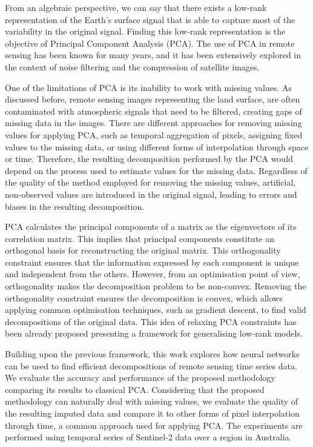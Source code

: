 \documentclass[essd, manuscript]{copernicus}
\begin{document}
From an algebraic perspective, we can say that there exists a low-rank representation of the Earth's surface signal that is able to capture most of the variability in the original signal. Finding this low-rank representation is the objective of Principal Component Analysis (PCA). The use of PCA in remote sensing has been known for many years, and it has been extensively explored in the context of noise filtering and the compression of satellite images.

One of the limitations of PCA is its inability to work with missing values. As discussed before, remote sensing images representing the land surface, are often contaminated with atmospheric signals that need to be filtered, creating gaps of missing data in the images. There are different approaches for removing missing values for applying PCA, such as temporal aggregation of pixels, assigning fixed values to the missing data, or using different forms of interpolation through space or time. Therefore, the resulting decomposition performed by the PCA would depend on the process used to estimate values for the missing data. Regardless of the quality of the method employed for removing the missing values, artificial, non-observed values are introduced in the original signal, leading to errors and biases in the resulting decomposition.

PCA calculates the principal components of a matrix as the eigenvectors of its correlation matrix. This implies that principal components constitute an orthogonal basis for reconstructing the original matrix. This orthogonality constraint ensures that the information expressed by each component is unique and independent from the others. However, from an optimisation point of view, orthogonality makes the decomposition problem to be non-convex. Removing the orthogonality constraint ensures the decomposition is convex, which allows applying common optimisation techniques, such as gradient descent, to find valid decompositions of the original data. This idea of relaxing PCA constraints has been already proposed \citep{udell2014generalized} presenting a framework for generalising low-rank models.

Building upon the previous framework, this work explores how neural networks can be used to find efficient decompositions of remote sensing time series data. We evaluate the accuracy and performance of the proposed methodology comparing its results to classical PCA. Considering that the proposed methodology can naturally deal with missing values, we evaluate the quality of the resulting imputed data and compare it to other forms of pixel interpolation through time, a common approach used for applying PCA. The experiments are performed using temporal series of Sentinel-2 data over a region in Australia.
\end{document}
